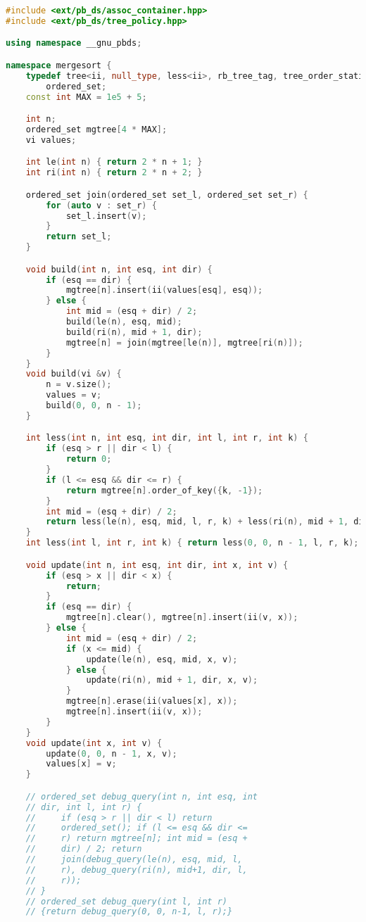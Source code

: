 \documentclass[10pt, a4paper, oneside]{book}
\begin{document}
\begin{lstlisting}[language=C++]
#include <ext/pb_ds/assoc_container.hpp>
#include <ext/pb_ds/tree_policy.hpp>

using namespace __gnu_pbds;

namespace mergesort {
    typedef tree<ii, null_type, less<ii>, rb_tree_tag, tree_order_statistics_node_update>
        ordered_set;
    const int MAX = 1e5 + 5;

    int n;
    ordered_set mgtree[4 * MAX];
    vi values;

    int le(int n) { return 2 * n + 1; }
    int ri(int n) { return 2 * n + 2; }

    ordered_set join(ordered_set set_l, ordered_set set_r) {
        for (auto v : set_r) {
            set_l.insert(v);
        }
        return set_l;
    }

    void build(int n, int esq, int dir) {
        if (esq == dir) {
            mgtree[n].insert(ii(values[esq], esq));
        } else {
            int mid = (esq + dir) / 2;
            build(le(n), esq, mid);
            build(ri(n), mid + 1, dir);
            mgtree[n] = join(mgtree[le(n)], mgtree[ri(n)]);
        }
    }
    void build(vi &v) {
        n = v.size();
        values = v;
        build(0, 0, n - 1);
    }

    int less(int n, int esq, int dir, int l, int r, int k) {
        if (esq > r || dir < l) {
            return 0;
        }
        if (l <= esq && dir <= r) {
            return mgtree[n].order_of_key({k, -1});
        }
        int mid = (esq + dir) / 2;
        return less(le(n), esq, mid, l, r, k) + less(ri(n), mid + 1, dir, l, r, k);
    }
    int less(int l, int r, int k) { return less(0, 0, n - 1, l, r, k); }

    void update(int n, int esq, int dir, int x, int v) {
        if (esq > x || dir < x) {
            return;
        }
        if (esq == dir) {
            mgtree[n].clear(), mgtree[n].insert(ii(v, x));
        } else {
            int mid = (esq + dir) / 2;
            if (x <= mid) {
                update(le(n), esq, mid, x, v);
            } else {
                update(ri(n), mid + 1, dir, x, v);
            }
            mgtree[n].erase(ii(values[x], x));
            mgtree[n].insert(ii(v, x));
        }
    }
    void update(int x, int v) {
        update(0, 0, n - 1, x, v);
        values[x] = v;
    }

    // ordered_set debug_query(int n, int esq, int
    // dir, int l, int r) {
    //     if (esq > r || dir < l) return
    //     ordered_set(); if (l <= esq && dir <=
    //     r) return mgtree[n]; int mid = (esq +
    //     dir) / 2; return
    //     join(debug_query(le(n), esq, mid, l,
    //     r), debug_query(ri(n), mid+1, dir, l,
    //     r));
    // }
    // ordered_set debug_query(int l, int r)
    // {return debug_query(0, 0, n-1, l, r);}


\end{lstlisting}
\end{document}
